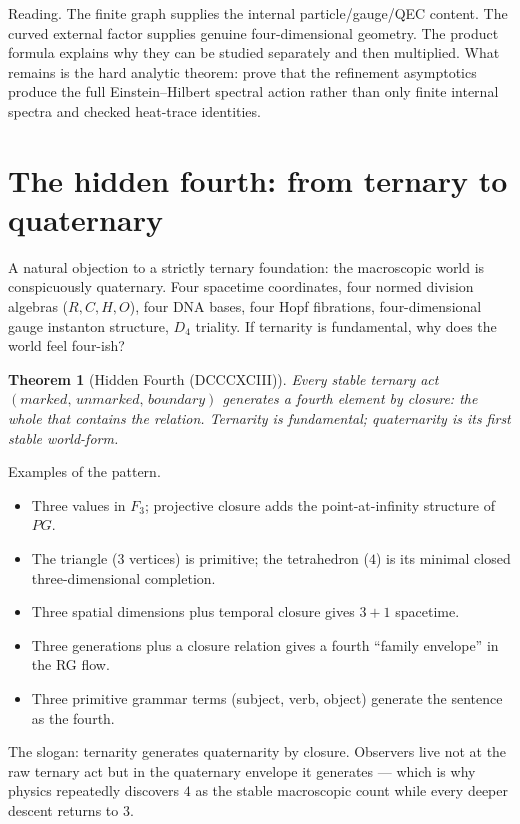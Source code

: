 \documentclass[11pt]{article}
\def\mathbb#1{#1}%
\def\mathrm#1{#1}%
\def\textbf#1{#1}%
\def\text#1{#1}%
\newtheorem*{theorem}{Theorem}
\begin{document}
\textbf{Reading.} The finite graph supplies the internal particle/gauge/QEC content. The curved external factor supplies genuine four-dimensional geometry. The product formula explains why they can be studied separately and then multiplied. What remains is the hard analytic theorem: prove that the refinement asymptotics produce the full Einstein--Hilbert spectral action rather than only finite internal spectra and checked heat-trace identities.

\section{The hidden fourth: from ternary to quaternary}

\label{sec:hidden-fourth}

A natural objection to a strictly ternary foundation: the macroscopic world is conspicuously quaternary. Four spacetime coordinates, four normed division algebras ($\mathbb{R}, \mathbb{C}, \mathbb{H}, \mathbb{O}$), four DNA bases, four Hopf fibrations, four-dimensional gauge instanton structure, $D_4$ triality. If ternarity is fundamental, why does the world feel four-ish?

\begin{theorem}[Hidden Fourth (DCCCXCIII)]
Every stable ternary act $(\text{marked},\,\text{unmarked},\,\text{boundary})$ generates a fourth element by closure: the \emph{whole} that contains the relation. Ternarity is fundamental; quaternarity is its first stable world-form.
\end{theorem}

\textbf{Examples of the pattern.}
\begin{itemize}[leftmargin=2em]
\item Three values in $\mathbb{F}_3$; projective closure adds the point-at-infinity structure of $\mathrm{PG}$.
\item The triangle ($3$ vertices) is primitive; the tetrahedron ($4$) is its minimal closed three-dimensional completion.
\item Three spatial dimensions plus temporal closure gives $3+1$ spacetime.
\item Three generations plus a closure relation gives a fourth ``family envelope'' in the RG flow.
\item Three primitive grammar terms (subject, verb, object) generate the sentence as the fourth.
\end{itemize}

The slogan: \textbf{ternarity generates quaternarity by closure}. Observers live not at the raw ternary act but in the quaternary envelope it generates --- which is why physics repeatedly discovers $4$ as the stable macroscopic count while every deeper descent returns to $3$.
\end{document}
